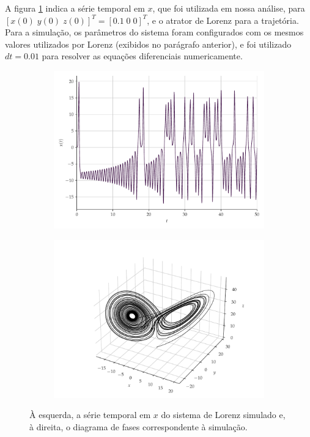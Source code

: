 \documentclass[a4paper, 12pt]{article}
\begin{document}
A figura \ref{fig:lorenz} indica a série temporal em $x$, que foi utilizada em nossa análise, para $[x(0)\; y(0)\; z(0)]^T = [0.1\; 0\; 0]^T$, e o atrator de Lorenz para a trajetória. Para a simulação, os parâmetros do sistema foram configurados com os mesmos valores utilizados por Lorenz (exibidos no parágrafo anterior), e foi utilizado $dt = 0.01$ para resolver as equações diferenciais numericamente.
\begin{figure}[H]
     \begin{subfigure}[t]{0.35\textwidth} 
         \includegraphics[scale=0.35]{serie-lorenz-x.pdf}
     \end{subfigure}
     \centering
     \begin{subfigure}[t]{0.35\textwidth}
         \includegraphics[scale=0.39]{diagrama-de-fases-lorenz.pdf}
     \end{subfigure}
     \caption{À esquerda, a série temporal em $x$ do sistema de Lorenz simulado e, à direita, o diagrama de fases correspondente à simulação.}
     \label{fig:lorenz}
\end{figure}
\end{document}
